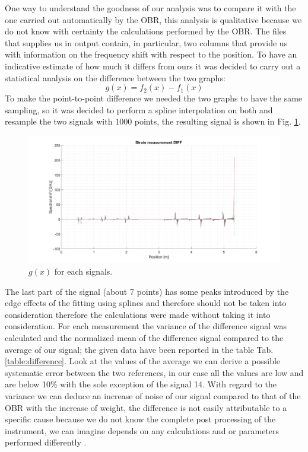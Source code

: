 One way to understand the goodness of our analysis was to compare it with the one carried out automatically by the OBR, this analysis is qualitative because we do not know with certainty the calculations performed by the OBR. The files that supplies us in output contain, in particular, two columns that provide us with information on the frequency shift with respect to the position. To have an indicative estimate of how much it differs from ours it was decided to carry out a statistical analysis on the difference between the two graphs:
$$g(x) = f_2(x) - f_1(x)$$
To make the point-to-point difference we needed the two graphs to have the same sampling, so it was decided to perform a spline interpolation on both and resample the two signals with 1000 points, the resulting signal is shown in Fig. \ref{fig:difference}.
\begin{figure}[H]
	\centering
	\includegraphics[scale=0.3]{img/diff.png}
	\caption{$g(x)$ for each signals.}\label{fig:difference}
\end{figure}
The last part of the signal (about 7 points) has some peaks introduced by the edge effects of the fitting using splines and therefore should not be taken into consideration therefore the calculations were made without taking it into consideration.
For each measurement the variance of the difference signal was calculated and the normalized mean of the difference signal compared to the average of our signal; the given data have been reported in the table Tab. \ref{table:difference}. Look at the values of the average we can derive a possible systematic error between the two references, in our case all the values are low and are below 10\% with the sole exception of the signal 14. With regard to the variance we can deduce an increase of noise of our signal compared to that of the OBR with the increase of weight, the difference is not easily attributable to a specific cause because we do not know the complete post processing of the instrument, we can imagine depends on any calculations and or parameters performed differently .

